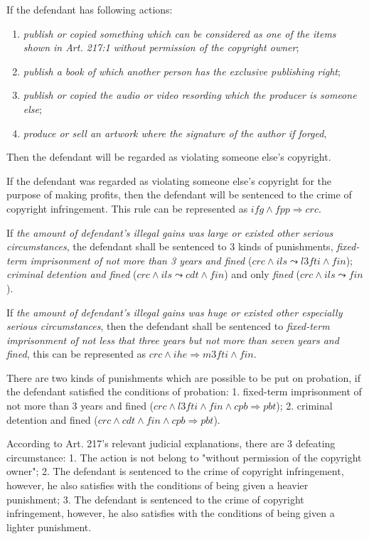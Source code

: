 \documentclass{IOS-Book-Article}
\begin{document}
If the defendant has following actions:
\begin{enumerate}
\item \textit{publish or copied something which can be considered as one of the items shown in Art. 217:1 without permission of the copyright owner};
\item \textit{publish a book of which another person has the exclusive publishing right};
\item  \textit{publish or copied the audio or video resording which the producer is someone else};
\item \textit{produce or sell an artwork where the signature of the author if forged},
\end{enumerate}
Then the defendant will be regarded as violating someone else's copyright.

If the defendant was regarded as violating someone else's copyright for the purpose of making profits, then the defendant will be sentenced to the crime of copyright infringement. This rule can be represented as $ifg \wedge fpp \Rightarrow crc$.

If \textit{the amount of defendant's illegal gains was large or existed other serious circumstances}, the defendant shall be sentenced to 3 kinds of punishments, \textit{fixed-term imprisonment of not more than 3 years and fined} ($crc \wedge ils \leadsto l3fti \wedge fin$); \textit{criminal detention and fined} ($crc \wedge ils \leadsto cdt \wedge fin$) and only \textit{fined} ($crc \wedge ils \leadsto fin$).

If \textit{the amount of defendant's illegal gains was huge or existed other especially serious circumstances}, then the defendant shall be sentenced to \textit{fixed-term imprisonment of not less that three years but not more than seven years and fined}, this can be represented as $crc \wedge ihe \Rightarrow m3fti \wedge fin$.

There are two kinds of punishments which are possible to be put on probation, if the defendant satisfied the conditions of probation: 
1. fixed-term imprisonment of not more than 3 years and fined ($crc \wedge l3fti \wedge fin \wedge cpb \Rightarrow pbt$); 2. criminal detention and fined ($crc \wedge cdt \wedge fin \wedge cpb \Rightarrow pbt$).

According to Art. 217's relevant judicial explanations, there are 3 defeating circumstance: 1. The action is not belong to "without permission of the copyright owner"; 2. The defendant is sentenced to the crime of copyright infringement, however, he also satisfies with the conditions of being given a heavier punishment; 3. The defendant is sentenced to the crime of copyright infringement, however, he also satisfies with the conditions of being given a lighter punishment.
\end{document}
